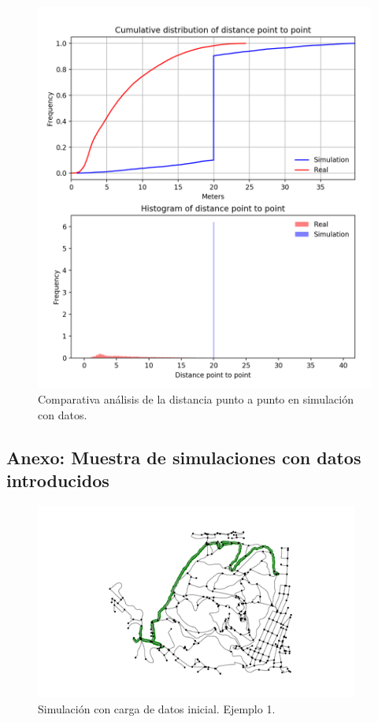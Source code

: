 \begin{figure}[!htb]
\begin{minipage}{0.48\textwidth}
\includegraphics[width=1.2\textwidth]{./Imagenes/SimulationComparativeEmptyNormalized.png}
\caption{Comparativa análisis de la distancia punto a punto en simulación con datos.}
\label{figure:ComparativaEmpty}
\end{minipage}
\end{figure}
\newpage
\subsection{Anexo: Muestra de simulaciones con datos introducidos} 
\label{subseciton:SimulationSample}\begin{figure}[h]
\begin{center}
\includegraphics[width=0.95\textwidth]{./Imagenes/data-simulation/track1.png}
\caption{Simulación con carga de datos inicial. Ejemplo 1.}
\end{center}
\label{figure:Simulation1}
\end{figure}

